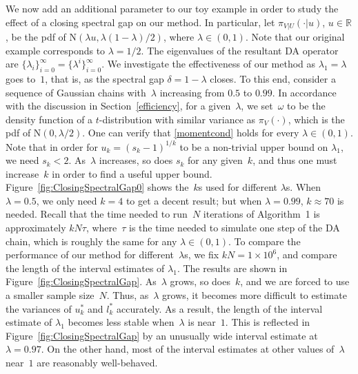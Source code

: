\documentclass[11pt]{article}
\begin{document}
         We now add an additional parameter to our toy example in
         order to study the effect of a closing spectral gap on our method.
         In particular, let
         $\pi_{V|U}(\cdot|u)$, $u \in \mathbb{R}$, be the pdf of
         $\mbox{N}(\lambda u, \lambda(1-\lambda)/2)$, where $\lambda \in (0,1)$.
         Note that our original example corresponds to $\lambda=1/2$.
         The eigenvalues of the resultant DA operator are $\{\lambda_i\}_{i=0}^{\infty} = \{\lambda^i\}_{i=0}^{\infty}$.
         We investigate the effectiveness of our method as $\lambda_1 = \lambda$ goes to~$1$, that is, as the spectral gap $\delta = 1-\lambda$ closes.
         To this end, consider a sequence of Gaussian chains with~$\lambda$ increasing from $0.5$ to $0.99$.
         In accordance with the discussion in Section~\ref{efficiency}, for a given~$\lambda$, we set~$\omega$ to be the density function of a $t$-distribution with similar variance as $\pi_V(\cdot)$, which is the pdf of $\mbox{N}(0,\lambda/2)$.
         One can verify that \eqref{momentcond} holds for every $\lambda \in (0,1)$.
         Note that in order for $u_k = (s_k-1)^{1/k}$ to be a non-trivial upper bound on $\lambda_1$, we need $s_k < 2$.
         As~$\lambda$ increases, so does $s_k$ for any given~$k$, and thus one must increase~$k$ in order to find a useful upper bound.
         Figure~\ref{fig:ClosingSpectralGap0} shows the~$k$s used for different $\lambda$s.
         When $\lambda = 0.5$, we only need $k=4$ to get a decent result; but when $\lambda = 0.99$, $k \approx 70$ is needed.
         Recall that the time needed to run~$N$ iterations of Algorithm~1 is approximately $kN\tau$, where~$\tau$ is the time needed to simulate one step of the DA chain, which is roughly the same for any $\lambda \in (0,1)$.
         To compare the performance of our method for different~$\lambda$s, we fix $kN = 1 \times 10^6$, and compare the length of the interval estimates of $\lambda_1$.
         The results are shown in Figure~\ref{fig:ClosingSpectralGap}.
         As~$\lambda$ grows, so does~$k$, and we are forced to use a smaller sample size~$N$.
         Thus, as~$\lambda$ grows, it becomes more difficult to estimate the variances of $u_k^*$ and $l_k^*$ accurately.
         As a result, the length of the interval estimate of $\lambda_1$ becomes less stable when~$\lambda$ is near~$1$.
         This is reflected in Figure~\ref{fig:ClosingSpectralGap} by an unusually wide interval estimate at $\lambda = 0.97$.
         On the other hand, most of the interval estimates at other values of~$\lambda$ near~$1$ are reasonably well-behaved.
                  
\end{document}
